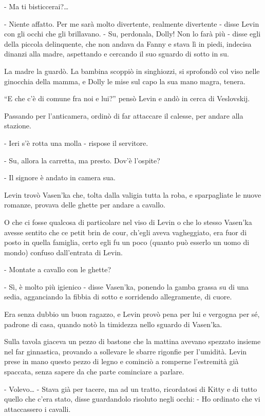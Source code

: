 - Ma ti bisticcerai?\ldots{} 

- Niente affatto. Per me sarà molto divertente, realmente divertente - disse Levin con gli occhi che gli brillavano. - Su, perdonala, Dolly! Non lo farà più - disse egli della piccola delinquente, che non andava da Fanny e stava lì in piedi, indecisa dinanzi alla madre, aspettando e cercando il suo sguardo di sotto in su. 

La madre la guardò. La bambina scoppiò in singhiozzi, si sprofondò col viso nelle ginocchia della mamma, e Dolly le mise sul capo la sua mano magra, tenera. 

``E che c'è di comune fra noi e lui?'' pensò Levin e andò in cerca di Veslovskij. 

Passando per l'anticamera, ordinò di far attaccare il calesse, per andare alla stazione. 

- Ieri s'è rotta una molla - rispose il servitore. 

- Su, allora la carretta, ma presto. Dov'è l'ospite? 

- Il signore è andato in camera sua. 

Levin trovò Vasen'ka che, tolta dalla valigia tutta la roba, e sparpagliate le nuove romanze, provava delle ghette per andare a cavallo. 

O che ci fosse qualcosa di particolare nel viso di Levin o che lo stesso Vasen'ka avesse sentito che ce petit brin de cour, ch'egli aveva vagheggiato, era fuor di posto in quella famiglia, certo egli fu un poco (quanto può esserlo un uomo di mondo) confuso dall'entrata di Levin. 

- Montate a cavallo con le ghette? 

- Sì, è molto più igienico - disse Vasen'ka, ponendo la gamba grassa su di una sedia, agganciando la fibbia di sotto e sorridendo allegramente, di cuore. 

Era senza dubbio un buon ragazzo, e Levin provò pena per lui e vergogna per sé, padrone di casa, quando notò la timidezza nello sguardo di Vasen'ka. 

Sulla tavola giaceva un pezzo di bastone che la mattina avevano spezzato insieme nel far ginnastica, provando a sollevare le sbarre rigonfie per l'umidità. Levin prese in mano questo pezzo di legno e cominciò a romperne l'estremità già spaccata, senza sapere da che parte cominciare a parlare. 

- Volevo\ldots{} - Stava già per tacere, ma ad un tratto, ricordatosi di Kitty e di tutto quello che c'era stato, disse guardandolo risoluto negli occhi: - Ho ordinato che vi attaccassero i cavalli. 

